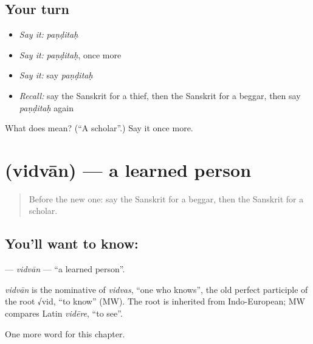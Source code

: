 \subsection*{Your turn}
\begin{itemize}
\raggedright
  \item \emph{Say it:} \emph{paṇḍitaḥ}
  \item \emph{Say it:} \emph{paṇḍitaḥ}, once more
  \item \emph{Say it:} say \emph{paṇḍitaḥ}
  \item \emph{Recall:} say the Sanskrit for a thief, then the Sanskrit for a beggar, then say \emph{paṇḍitaḥ} again
\end{itemize}

\begin{tcolorbox}[breakable,colback=teal!4,colframe=teal!35!black,title={Before you move on}]
What does  mean? (\textquotedblleft{}A scholar\textquotedblright{}.) Say it once more.
\end{tcolorbox}
\section[\texorpdfstring{\sk{विद्वान्} (vidvān)}{विद्वान् (vidvān)}]{ (vidvān) — a learned person}

\label{lesson:SA-C180-vidvan}



\begin{quote}
Before the new one: say the Sanskrit for a beggar, then the Sanskrit for a scholar.
\end{quote}

\subsection*{You'll want to know: }
\textbf{} — \emph{vidvān} — \textquotedblleft{}a learned person\textquotedblright{}.

\begin{cousinweb}
\emph{vidvān} is the nominative of \emph{vidvas}, \textquotedblleft{}one who knows\textquotedblright{}, the old perfect participle of the root √vid, \textquotedblleft{}to know\textquotedblright{} (MW). The root is inherited from Indo-European; MW compares Latin \emph{vidēre}, \textquotedblleft{}to see\textquotedblright{}.
\end{cousinweb}

\begin{grammarlens}[title={What you've built}]
One more word for this chapter.
\end{grammarlens}

